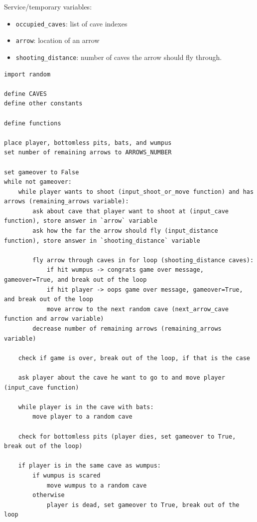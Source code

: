 \documentclass[
]{book}
\providecommand{\tightlist}{%
  \setlength{\itemsep}{0pt}\setlength{\parskip}{0pt}}
\begin{document}
Service/temporary variables:

\begin{itemize}
\tightlist
\item
  \texttt{occupied\_caves}: list of cave indexes
\item
  \texttt{arrow}: location of an arrow
\item
  \texttt{shooting\_distance}: number of caves the arrow should fly through.
\end{itemize}

\begin{verbatim}
import random

define CAVES
define other constants

define functions 

place player, bottomless pits, bats, and wumpus
set number of remaining arrows to ARROWS_NUMBER

set gameover to False
while not gameover:
    while player wants to shoot (input_shoot_or_move function) and has arrows (remaining_arrows variable):
        ask about cave that player want to shoot at (input_cave function), store answer in `arrow` variable
        ask how the far the arrow should fly (input_distance function), store answer in `shooting_distance` variable
        
        fly arrow through caves in for loop (shooting_distance caves):
            if hit wumpus -> congrats game over message, gameover=True, and break out of the loop
            if hit player -> oops game over message, gameover=True, and break out of the loop
            move arrow to the next random cave (next_arrow_cave function and arrow variable)
        decrease number of remaining arrows (remaining_arrows variable)
        
    check if game is over, break out of the loop, if that is the case
        
    ask player about the cave he want to go to and move player (input_cave function)
    
    while player is in the cave with bats: 
        move player to a random cave
    
    check for bottomless pits (player dies, set gameover to True, break out of the loop)
    
    if player is in the same cave as wumpus:
        if wumpus is scared
            move wumpus to a random cave
        otherwise
            player is dead, set gameover to True, break out of the loop
\end{verbatim}
\end{document}
